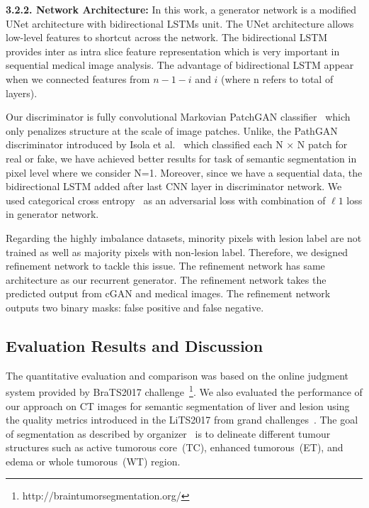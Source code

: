 \documentclass[10pt,twocolumn,letterpaper]{article}
\begin{document}
\textbf{3.2.2. Network Architecture:} In this work, a generator network is a modified UNet architecture with bidirectional LSTMs unit. The UNet architecture allows low-level features to shortcut across the network. The bidirectional LSTM provides inter as intra slice feature representation which is very important in sequential medical image analysis. The advantage of bidirectional LSTM appear when we connected features from $n-1-i$ and $i$ (where n refers to total of layers).

Our discriminator is fully convolutional Markovian PatchGAN classifier~\cite{Phillipimagetoimage2017} which only penalizes structure at the scale of image patches.
Unlike, the PathGAN discriminator introduced by Isola et al.~\cite{Phillipimagetoimage2017} which classified each N × N patch for real or fake, we have achieved better results for task of semantic segmentation in pixel level where we consider N=1. Moreover, since we have a sequential data, the bidirectional LSTM added after last CNN layer in discriminator network. We used categorical cross entropy~\cite{nasr2002cross} as an adversarial loss with combination of $\ell1$ loss in generator network.

Regarding the highly imbalance datasets, minority pixels with lesion label are not trained as well as majority pixels with non-lesion label. Therefore, we designed refinement network to tackle this issue. The refinement network has same architecture as our recurrent generator. The refinement network takes the predicted output from cGAN and medical images. The refinement network outputs two binary masks: false positive and false negative. 

\subsection{Evaluation Results and Discussion}\label{evaluation}
The quantitative evaluation and comparison was based on the online judgment system provided by BraTS2017 challenge~\footnote{http://braintumorsegmentation.org/}.
We also evaluated the performance of our approach on CT images for semantic segmentation of liver and lesion using the quality metrics introduced in the LiTS2017 from grand challenges~\cite{heimann2009comparison}. 
The goal of segmentation as described by organizer~\cite{Menze2014,Bakasnature2017,Bakastcg2017,Bakaslgg2017} is to delineate different tumour structures such as active tumorous core~(TC), enhanced tumorous~(ET), and edema or whole tumorous~(WT) region.
\end{document}
